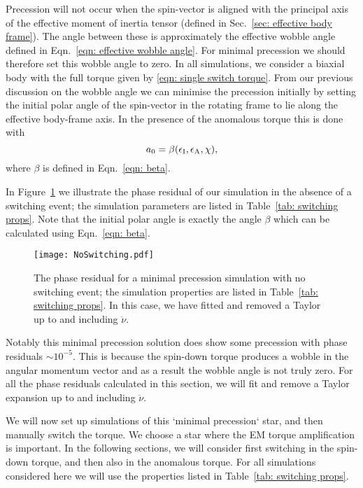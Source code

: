 \documentclass[../full_thesis/full_thesis.tex]{subfiles}
\newcommand{\thisdir}{../inertial_frame}
\begin{document}
Precession will not occur when the spin-vector is aligned with the principal
axis of the effective moment of inertia tensor (defined in Sec.~\ref{sec:
effective body frame}). The angle between these is approximately the
effective wobble angle defined in Eqn.~\eqref{eqn: effective wobble angle}.
For minimal precession we should therefore set this wobble angle to
zero. In all simulations, we consider a biaxial body with the full torque given
by \eqref{eqn: single switch torque}. From our previous discussion on the
wobble angle we can minimise the precession initially by setting the initial polar angle
of the spin-vector in the rotating frame to lie along the effective body-frame
axis. In the presence of the anomalous torque this is done with
\begin{equation}
a_{0} = \beta(\epsilon_{\mathrm{I}}, \epsilon_{\mathrm{A}}, \chi),
\end{equation}
where $\beta$ is defined in Eqn.~\ref{eqn: beta}.

In Figure~\ref{fig: no switching} we illustrate the phase residual of our
simulation in the absence of a switching event; the simulation parameters are
listed in Table~\ref{tab: switching props}. Note that the initial polar angle
is exactly the angle $\beta$ which can be calculated using Eqn.~\eqref{eqn:
beta}.
\begin{figure}[htb]
\texttt{[image: NoSwitching.pdf]}
\caption{The phase residual for a minimal precession simulation with no
         switching event; the simulation properties are listed in
         Table~\ref{tab: switching props}. In this case, we have fitted and
         removed a Taylor up to and including $\ddot{\nu}$.}
\label{fig: no switching}
\end{figure}
\begin{table}[htb]
\centering

\caption{Simulation properties used for Figure~\ref{fig: no switching},
Figure~\ref{fig: switching without anom}, and Figure~\ref{fig: switching with anom}.}
\label{tab: switching props}
\end{table}

Notably this minimal precession solution does show some precession with phase
residuals $\sim 10^{-5}$. This is because the spin-down torque produces a wobble
in the angular momentum vector and as a result the wobble angle is not truly
zero. For all the phase residuals calculated in this section, we will fit and
remove a Taylor expansion up to and including $\ddot{\nu}$.

We will now set up simulations of this `minimal precession` star, and then
manually switch the torque. We choose a star where the EM torque amplification is
important.  In the following sections, we will consider first switching in the
spin-down torque, and then also in the anomalous torque. For all simulations
considered here we will use the properties listed in Table~\ref{tab: switching
props}.
\end{document}
